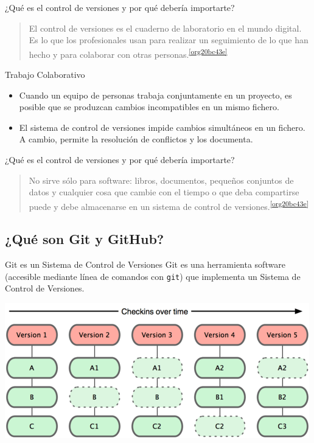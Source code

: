 \documentclass[aspectratio=169, xcolor={usenames,svgnames,dvipsnames}]{beamer}
\begin{document}
\begin{frame}[label={sec:orgf4e55e6}]{¿Qué es el control de versiones y por qué debería importarte?}
\begin{quote}
El control de versiones es el \alert{cuaderno de laboratorio} en el mundo digital. Es lo que los profesionales usan para realizar un
\alert{seguimiento} de lo que han hecho y para \alert{colaborar} con otras
personas.\textsuperscript{\ref{org20bc43e}}
\end{quote}

\begin{block}{Trabajo Colaborativo}
\begin{itemize}
\item Cuando un equipo de personas trabaja conjuntamente en un proyecto, es posible que se produzcan cambios incompatibles en un mismo fichero.
\item El sistema de control de versiones \alert{impide} cambios simultáneos en un fichero. A cambio, permite la \alert{resolución de conflictos} y los documenta.
\end{itemize}
\end{block}
\end{frame}

\begin{frame}[label={sec:org2031fcb}]{¿Qué es el control de versiones y por qué debería importarte?}
\begin{quote}
\alert{No sirve sólo para software}: libros, documentos, pequeños conjuntos
de datos y cualquier cosa que cambie con el tiempo o que deba
compartirse puede y debe almacenarse en un sistema de control de
versiones.\textsuperscript{\ref{org20bc43e}}
\end{quote}
\end{frame}

\subsection{¿Qué son Git y GitHub?}
\label{sec:orgedf756b}

\begin{frame}[label={sec:orgc90fc56},fragile]{Git es un Sistema de Control de Versiones}
 Git es una herramienta software (accesible mediante línea de comandos con \texttt{git}) que implementa un Sistema de Control de Versiones.

\begin{center}
\includegraphics[width=.9\linewidth]{figs/git_model.png}
\end{center}
\end{frame}
\end{document}

